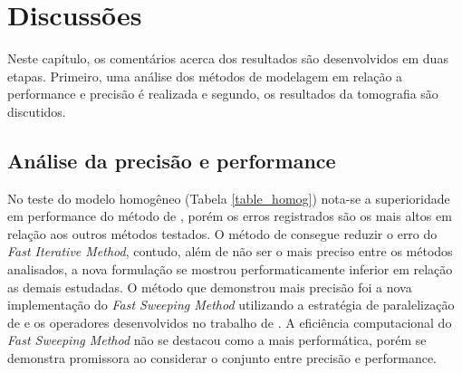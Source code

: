 \chapter{Discussões}
\label{ch:discussoes}

 
Neste capítulo, os comentários acerca dos resultados são desenvolvidos em duas etapas. Primeiro, uma análise dos métodos de modelagem em relação a performance e precisão é realizada e segundo, os resultados da tomografia são discutidos.   
 
\section{Análise da precisão e performance} 

No teste do modelo homogêneo (Tabela \ref{table_homog}) nota-se a superioridade em performance do método de , porém os erros registrados são os mais altos em relação aos outros métodos testados. O método de  consegue reduzir o erro do \textit{Fast Iterative Method}, contudo, além de não ser o mais preciso entre os métodos analisados, a nova formulação se mostrou performaticamente inferior em relação as demais estudadas. O método que demonstrou mais precisão foi a nova implementação do \textit{Fast Sweeping Method} utilizando a estratégia de paralelização de  e os operadores desenvolvidos no trabalho de . A eficiência computacional do \textit{Fast Sweeping Method} não se destacou como a mais performática, porém se demonstra promissora ao considerar o conjunto entre precisão e performance.  

